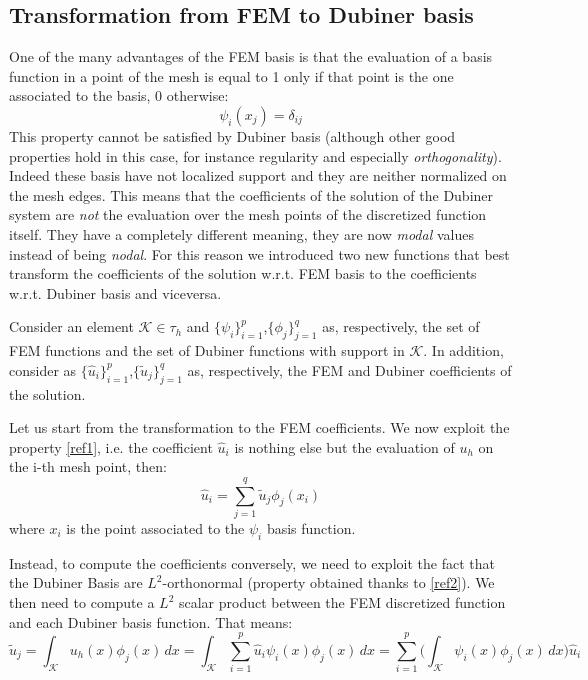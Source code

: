 \documentclass[a4paper]{article}
\begin{document}
\subsection{Transformation from FEM to Dubiner basis} \label{ref7}
	One of the many advantages of the FEM basis is that the evaluation of a basis function in a point of the mesh is equal to 1 only if that point is the one associated to the basis, 0 otherwise:
	\begin{equation} \label{ref1}
	\psi_i(x_j)=\delta_{ij}
	\end{equation}
	This property cannot be satisfied by Dubiner basis (although other good properties hold in this case, for instance regularity and especially \emph{orthogonality}). Indeed these basis have not localized support and they are neither normalized on the mesh edges. This means that the coefficients of the solution of the Dubiner system are \emph{not} the evaluation over the mesh points of the discretized function itself. They have a completely different meaning, they are now \emph{modal} values instead of being \emph{nodal}.
	For this reason we introduced two new functions that best transform the coefficients of the solution w.r.t. FEM basis to the coefficients w.r.t. Dubiner basis and viceversa.\vspace{5mm}
	
	\noindent Consider an element $\mathcal{K}\in \tau_h$ and $\{\psi_{i}\}_{i=1}^{p}$,$\{\phi_{j}\}_{j=1}^{q}$ as, respectively, the set of FEM functions and the set of Dubiner functions with support in $\mathcal{K}$. In addition, consider as $\{\hat{u}_i\}_{i=1}^p$,$\{\tilde{u}_j\}_{j=1}^q$ as, respectively, the FEM and Dubiner coefficients of the solution. \vspace{5mm}
	
	\noindent Let us start from the transformation to the FEM coefficients. We now exploit the property \ref{ref1}, i.e. the coefficient $\hat{u}_i$ is nothing else but the evaluation of $u_h$ on the i-th mesh point, then: 
	\begin{equation} \label{ref3}
	\hat{u}_i = \sum_{j=1}^q \tilde{u}_j\phi_j(x_i)
	\end{equation}
	where $x_i$ is the point associated to the $\psi_i$ basis function. \vspace{5mm}
	
	\noindent Instead, to compute the coefficients conversely, we need to exploit the fact that the Dubiner Basis are $L^2$-orthonormal (property obtained thanks to \ref{ref2}). We then need to compute a $L^2$ scalar product between the FEM discretized function and each Dubiner basis function. That means:
	\begin{equation}\label{ref4}
	\tilde{u}_j = \int_\mathcal{K} u_h(x) \phi_j(x) \,dx = \int_{\mathcal{K}} \sum_{i=1}^p \hat{u}_i\psi_i(x) \phi_j(x) \,dx = \sum_{i=1}^p \Big(\int_{\mathcal{K}}\psi_i(x)\phi_j(x)\,dx \Big) \hat{u}_i
	\end{equation}
	
\end{document}
